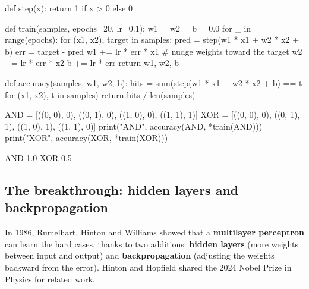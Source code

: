 \begin{pycode}
def step(x):
    return 1 if x > 0 else 0

def train(samples, epochs=20, lr=0.1):
    w1 = w2 = b = 0.0
    for _ in range(epochs):
        for (x1, x2), target in samples:
            pred = step(w1 * x1 + w2 * x2 + b)
            err = target - pred
            w1 += lr * err * x1      # nudge weights toward the target
            w2 += lr * err * x2
            b += lr * err
    return w1, w2, b

def accuracy(samples, w1, w2, b):
    hits = sum(step(w1 * x1 + w2 * x2 + b) == t for (x1, x2), t in samples)
    return hits / len(samples)

AND = [((0, 0), 0), ((0, 1), 0), ((1, 0), 0), ((1, 1), 1)]
XOR = [((0, 0), 0), ((0, 1), 1), ((1, 0), 1), ((1, 1), 0)]
print("AND", accuracy(AND, *train(AND)))
print("XOR", accuracy(XOR, *train(XOR)))
\end{pycode}
\begin{rawcode}
AND 1.0
XOR 0.5
\end{rawcode}

\subsection{The breakthrough: hidden layers and backpropagation}

In 1986, Rumelhart, Hinton and Williams showed that a \textbf{multilayer perceptron} can learn the
hard cases, thanks to two additions: \textbf{hidden layers} (more weights between input and output)
and \textbf{backpropagation} (adjusting the weights backward from the error). Hinton and Hopfield
shared the 2024 Nobel Prize in Physics for related work.

\begin{center}
\end{center}

